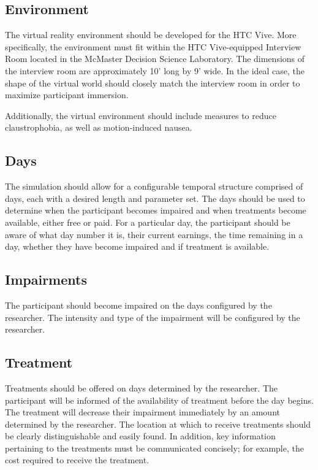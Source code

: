 \documentclass{article}
\begin{document}
\subsection{Environment}
The virtual reality environment should be developed for the HTC Vive. More specifically, the environment must fit within the HTC Vive-equipped Interview Room located in the McMaster Decision Science Laboratory. The dimensions of the interview room are approximately 10’ long by 9’ wide. In the ideal case, the shape of the virtual world should closely match the interview room in order to maximize participant immersion.

Additionally, the virtual environment should include measures to reduce claustrophobia, as well as motion-induced nausea.

\subsection{Days}
The simulation should allow for a configurable temporal structure comprised of days, each with a desired length and parameter set. The days should be used to determine when the participant becomes impaired and when treatments become available, either free or paid. For a particular day, the participant should be aware of what day number it is, their current earnings, the time remaining in a day, whether they have become impaired and if treatment is available.


\subsection{Impairments}
The participant should become impaired on the days configured by the researcher. The intensity and type of the impairment will be configured by the researcher.


\subsection{Treatment}
Treatments should be offered on days determined by the researcher. The participant will be informed of the availability of treatment before the day begins. The treatment will decrease their impairment immediately by an amount determined by the researcher. The location at which to receive treatments should be clearly distinguishable and easily found. In addition, key information pertaining to the treatments must be communicated concisely; for example, the cost required to receive the treatment.
\end{document}
